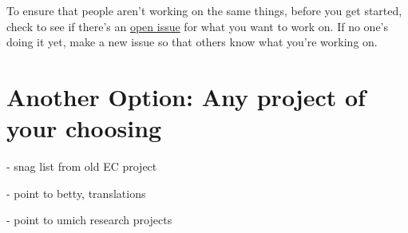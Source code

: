 \documentclass{article}
\begin{document}
To ensure that people aren't working on the same things, before you get
started, check to see if there's an
\href{https://github.com/c4cs/c4cs.github.io/issues}{open issue} for what you
want to work on. If no one's doing it yet, make a new issue so that others
know what you're working on.

\newpage

\section*{Another Option: Any project of your choosing}

 - snag list from old EC project

 - point to betty, translations

 - point to umich research projects
\end{document}
